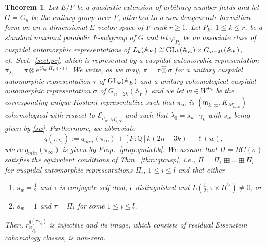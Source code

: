 \documentclass[a4paper,10pt]{amsart}
\newtheorem{thm}[equation]{Theorem}
\theoremstyle{definition}
\numberwithin{equation}{section}
\def\A{\mathbb A}
\def\Q{\mathbb Q}
\def\EE{\mathcal E}
\def\m{\mathfrak m}
\def\GL{{\rm GL}}
\begin{document}
\begin{thm}\label{thm:main}
Let $E/F$ be a quadratic extension of arbitrary number fields and let $G=G_n$ be the unitary group over $F$, attached to a non-dengenerate hermitian form on an $n$-dimensional $E$-vector space of $F$-rank $r\geq 1$. Let $P_k$, $1\leq k\leq r$, be a standard maximal parabolic $F$-subgroup of $G$ and let $\varphi_{P_k} $ be an associate class of cuspidal automorphic representations of $L_k(\A_F)\cong \GL_k(\A_E)\times G_{n-2k}(\A_F)$, cf.\ Sect.\ \ref{sect:pc}, which is represented by a cuspidal automorphic representation $\pi_{\lambda_0}=\pi\otimes e^{\langle \lambda_0, H_P(\cdot)\rangle}$. We write, as we may, $\pi=\tau\hat\otimes\sigma$ for a unitary cuspidal automorphic representation $\tau$ of $\GL_k(\A_E)$ and a unitary cohomological cuspidal automorphic representation $\sigma$ of $G_{n-2k}(\A_F)$ and we let  $w\in W^{P_k}$ be the corresponding unique Kostant representative such that $\pi_\infty$ is $(\m_{k,\infty},K_{M^\circ_{k,\infty}})$-cohomological with respect to $\EE_{\mu_w}|_{M^\circ_{k,\infty}}$ and such that $\lambda_0=s_w\cdot \gamma_k$ with $s_w$ being given by \eqref{sw}. Furthermore, we abbreviate
$$q(\pi_{\lambda_0}):=q_{min}(\pi_\infty) + [F:\Q] k(2n-3k) -\ell(w),$$
where $q_{min}(\pi_\infty)$ is given by Prop.\ \ref{prop:qminLk}.
We assume that $\Pi=BC(\sigma)$ satisfies the equivalent conditions of Thm.\ \ref{thm:qtcusp}, i.e., $\Pi=\Pi_1\boxplus...\boxplus\Pi_l$ for cuspidal automorphic representations $\Pi_i$, $1\leq i\leq l$ and that either
\begin{enumerate}
\item $s_w=\tfrac12$ and $\tau$ is conjugate self-dual, $\epsilon$-distinguished and $L(\tfrac12,\tau\times \Pi^\vee)\neq 0$; or
\item $s_w=1$ and $\tau=\Pi_i$ for some $1\leq i\leq l$.
\end{enumerate}
Then, $r^{q(\pi_{\lambda_0})}_{\varphi_{P_k}}$ is injective and its image, which consists of residual Eisenstein cohomology classes, is non-zero.
\end{thm}
\end{document}
